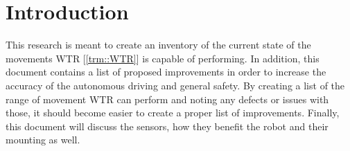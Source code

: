 \section{Introduction}
This research is meant to create an inventory of the current state of the movements WTR [\ref{trm::WTR}] is capable of performing.
In addition, this document contains a list of proposed improvements in order to increase the accuracy of the autonomous driving and general safety.
By creating a list of the range of movement WTR can perform and noting any defects or issues with those, it should become easier to create a proper list of improvements.
Finally, this document will discuss the sensors, how they benefit the robot and their mounting as well.
\newpage
